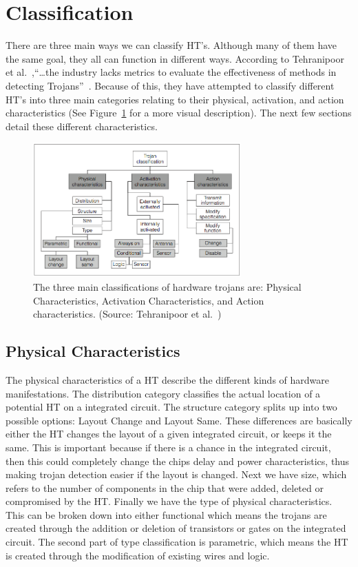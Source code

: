 \documentclass[letterpaper,twocolumn,11pt]{article}
\begin{document}
\section{Classification}
There are three main ways we can classify HT's. Although many of them have the same goal, they all can function in different ways. According to Tehranipoor et al.\ ,``\ldots the industry lacks metrics to evaluate the effectiveness of methods in detecting Trojans''~\cite {teh}. Because of this, they have attempted to classify different HT's into three main categories relating to their physical, activation, and action characteristics (See Figure~\ref{tax} for a more visual description). The next few sections detail these different characteristics.

\begin{figure}[ht!]
\centering
\includegraphics[width=80mm]{images/tax.png}
\caption{The three main classifications of hardware trojans are: Physical Characteristics, Activation Characteristics, and Action characteristics. (Source: Tehranipoor et al.~\cite {teh})}
\label{tax}
\end{figure}

\subsection{Physical Characteristics}
The physical characteristics of a HT describe the different kinds of hardware manifestations. The distribution category classifies the actual location of a potential HT on a integrated circuit. The structure category splits up into two possible options: Layout Change and Layout Same. These differences are basically either the HT changes the layout of a given integrated circuit, or keeps it the same. This is important because if there is a chance in the integrated circuit, then this could completely change the chips delay and power characteristics, thus making trojan detection easier if the layout is changed. Next we have size, which refers to the number of components in the chip that were added, deleted or compromised by the HT. Finally we have the type of physical characteristics. This can be broken down into either functional which means the trojans are created through the addition or deletion of transistors or gates on the integrated circuit. The second part of type classification is parametric, which means the HT is created through the modification of existing wires and logic.
\end{document}
